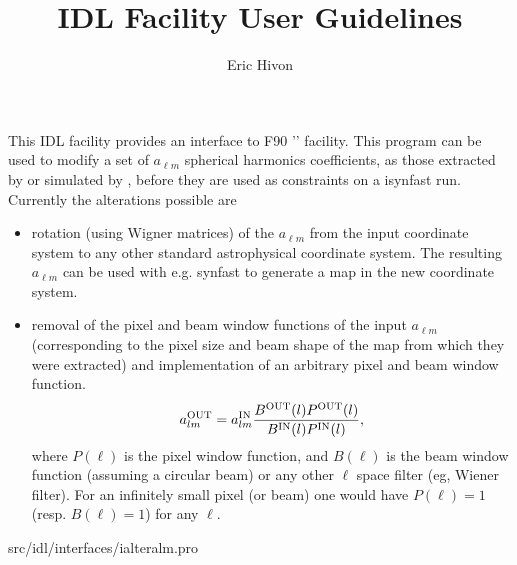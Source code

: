 
\sloppy

\title{\healpix IDL Facility User Guidelines}
 \section[ialteralm]{ }
\label{idl:ialteralm}
\author{Eric Hivon}

\begin{facility}
{This IDL facility provides an interface to F90 '' facility. 
This program can be used to modify a set of $a_{\ell m}$ spherical harmonics
  coefficients, as those extracted by  or 
  simulated by , before
  they are used as constraints on a isynfast run. Currently the alterations
  possible are %
\begin{itemize}
    \item rotation (using Wigner matrices) of the $a_{\ell m}$ from the input
    coordinate system to any other standard astrophysical coordinate system. The
    resulting $a_{\ell m}$ can be used with e.g. synfast to generate a map in the
    new coordinate system.
    \item removal of the pixel and beam window functions of the input
  $a_{\ell m}$ (corresponding to the pixel size and beam shape of the map from which
  they were extracted) and implementation of an arbitrary pixel and beam window
  function. 
\begin{equation} a_{\ell m}^{\rm OUT} = a_{\ell m}^{\rm IN} \frac{B^{\rm OUT}(\ell) P^{\rm 
 OUT}(\ell)}{B^{\rm IN}(\ell) P^{\rm IN}(\ell)}, \label{eq:alteralm} \end{equation}
where $P(\ell)$ is the pixel window function, and $B(\ell)$ is the beam window
 function (assuming a circular beam) or any other $\ell$ space filter (eg,
 Wiener filter). For an infinitely small pixel (or beam) one would have $P(\ell) =
 1$ (resp. $B(\ell) = 1$) for any $\ell$.
\end{itemize}
}
{src/idl/interfaces/ialteralm.pro}
\end{facility}


